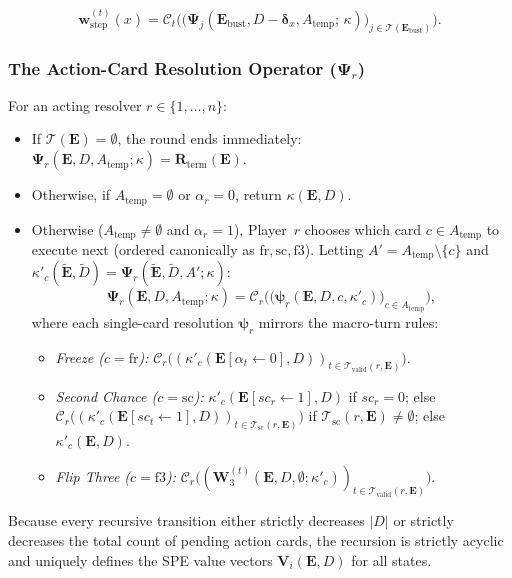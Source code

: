 \documentclass{article}
\theoremstyle{plain}
\theoremstyle{definition}
\theoremstyle{remark}
\begin{document}
\begin{itemize}
\begin{itemize}
        \[
            \mathbf{w}_{\text{step}}^{(t)}(x) = \mathcal{C}_t \Big( \big( \mathbf{\Psi}_j(\mathbf{E}_{\text{bust}}, D - \boldsymbol{\delta}_x, A_{\text{temp}}; \, \kappa) \big)_{j \in \mathcal{T}(\mathbf{E}_{\text{bust}})} \Big).
        \]
    \end{itemize}
\end{itemize}

\subsubsection{The Action-Card Resolution Operator ($\mathbf{\Psi}_r$)}
For an acting resolver $r \in \{1, \dots, n\}$:
\begin{itemize}
    \item If $\mathcal{T}(\mathbf{E}) = \emptyset$, the round ends immediately: $\mathbf{\Psi}_r(\mathbf{E}, D, A_{\text{temp}}; \kappa) = \mathbf{R}_{\text{term}}(\mathbf{E})$.
    \item Otherwise, if $A_{\text{temp}} = \emptyset$ or $\alpha_r = 0$, return $\kappa(\mathbf{E}, D)$.
    \item Otherwise ($A_{\text{temp}} \neq \emptyset$ and $\alpha_r = 1$), Player~$r$ chooses which card $c \in A_{\text{temp}}$ to execute next (ordered canonically as $\text{fr}, \text{sc}, \text{f3}$). Letting $A' = A_{\text{temp}} \setminus \{c\}$ and $\kappa'_c(\tilde{\mathbf{E}}, \tilde{D}) = \mathbf{\Psi}_r(\tilde{\mathbf{E}}, \tilde{D}, A'; \kappa)$:
    \[
        \mathbf{\Psi}_r(\mathbf{E}, D, A_{\text{temp}}; \kappa) = \mathcal{C}_r \Big( \big( \boldsymbol{\psi}_r(\mathbf{E}, D, c, \kappa'_c) \big)_{c \in A_{\text{temp}}} \Big),
    \]
    where each single-card resolution $\boldsymbol{\psi}_r$ mirrors the macro-turn rules:
    \begin{itemize}
        \item \textit{Freeze ($c = \text{fr}$):} $\mathcal{C}_r \big( ( \kappa'_c(\mathbf{E}[\alpha_t \leftarrow 0], D) )_{t \in \mathcal{T}_{\text{valid}}(r, \mathbf{E})} \big)$.
        \item \textit{Second Chance ($c = \text{sc}$):} $\kappa'_c(\mathbf{E}[sc_r \leftarrow 1], D)$ if $sc_r = 0$; else $\mathcal{C}_r \big( ( \kappa'_c(\mathbf{E}[sc_t \leftarrow 1], D) )_{t \in \mathcal{T}_{\text{sc}}(r, \mathbf{E})} \big)$ if $\mathcal{T}_{\text{sc}}(r, \mathbf{E}) \neq \emptyset$; else $\kappa'_c(\mathbf{E}, D)$.
        \item \textit{Flip Three ($c = \text{f3}$):} $\mathcal{C}_r \big( ( \mathbf{W}_3^{(t)}(\mathbf{E}, D, \emptyset; \kappa'_c) )_{t \in \mathcal{T}_{\text{valid}}(r, \mathbf{E})} \big)$.
    \end{itemize}
\end{itemize}
Because every recursive transition either strictly decreases $|D|$ or strictly decreases the total count of pending action cards, the recursion is strictly acyclic and uniquely defines the SPE value vectors $\mathbf{V}_i(\mathbf{E}, D)$ for all states.
\end{document}
